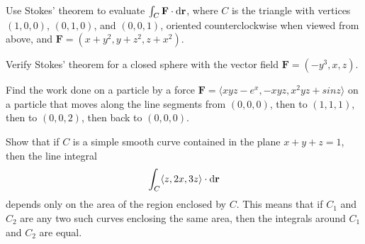 \documentclass[svgnames]{watsonbook}
\begin{document}

\begin{aexercise}
   Use Stokes' theorem to evaluate $\int_C\mathbf{F} \cdot \mathrm{d}\mathbf{r}$, where $C$ is the triangle with vertices $(1,0,0)$, $(0,1,0)$, and $(0,0,1)$, oriented counterclockwise when viewed from above, and $\mathbf{F} = (x+y^2,y+z^2,z+x^2)$. 
\end{aexercise}

\begin{aexercise}
  Verify Stokes' theorem for a closed sphere with the vector field
$\mathbf{F} = (-y^3,x,z)$. 
\end{aexercise}

\begin{aexercise}
  Find the work done on a particle by a force $\mathbf{F}=\langle
  xyz−e^x, −xyz, x^2yz+sin z \rangle$ on a particle that moves along the line segments from $(0, 0, 0)$, then to $(1, 1, 1)$, then to $(0, 0, 2)$, then back to $(0, 0, 0)$.
\end{aexercise}

\begin{aexercise}
Show that if $C$ is a simple smooth curve contained in the plane
$x+y+z = 1$, then the line integral
\[\int_C \langle z, 2x, 3z \rangle \cdot \mathrm{d}\mathbf{r}\]
depends only on the area of the region enclosed by $C$. This means
that if $C_1$ and $C_2$ are any two such curves enclosing the same area,
then the integrals around $C_1$ and $C_2$ are equal. 
\end{aexercise} 
\end{document}
